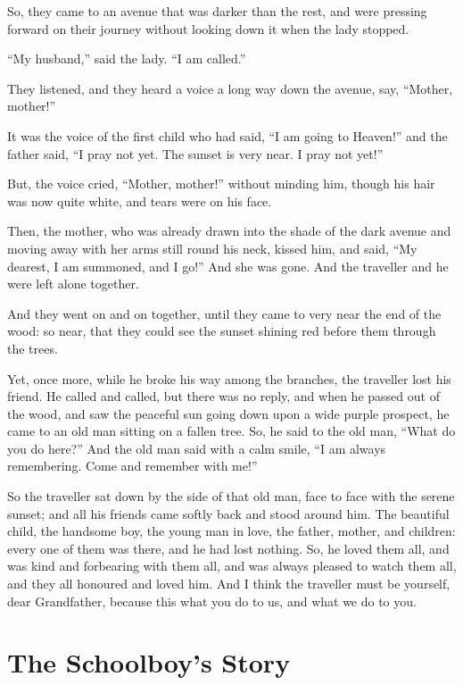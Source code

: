 So, they came to an avenue that was darker than the rest, and were
pressing forward on their journey without looking down it when the
lady stopped.

``My husband,'' said the lady.  ``I am called.''

They listened, and they heard a voice a long way down the avenue,
say, ``Mother, mother!''

It was the voice of the first child who had said, ``I am going to
Heaven!'' and the father said, ``I pray not yet.  The sunset is very
near.  I pray not yet!''

But, the voice cried, ``Mother, mother!'' without minding him, though
his hair was now quite white, and tears were on his face.

Then, the mother, who was already drawn into the shade of the dark
avenue and moving away with her arms still round his neck, kissed
him, and said, ``My dearest, I am summoned, and I go!''  And she was
gone.  And the traveller and he were left alone together.

And they went on and on together, until they came to very near the
end of the wood:  so near, that they could see the sunset shining
red before them through the trees.

Yet, once more, while he broke his way among the branches, the
traveller lost his friend.  He called and called, but there was no
reply, and when he passed out of the wood, and saw the peaceful sun
going down upon a wide purple prospect, he came to an old man
sitting on a fallen tree.  So, he said to the old man, ``What do you
do here?''  And the old man said with a calm smile, ``I am always
remembering.  Come and remember with me!''

So the traveller sat down by the side of that old man, face to face
with the serene sunset; and all his friends came softly back and
stood around him.  The beautiful child, the handsome boy, the young
man in love, the father, mother, and children:  every one of them
was there, and he had lost nothing.  So, he loved them all, and was
kind and forbearing with them all, and was always pleased to watch
them all, and they all honoured and loved him.  And I think the
traveller must be yourself, dear Grandfather, because this what you
do to us, and what we do to you.



\chapter{The Schoolboy's Story}



